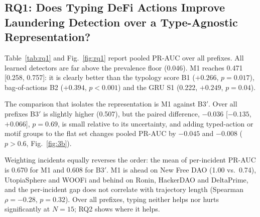 \documentclass[runningheads]{llncs}
\newcommand{\1}{\mathbb{1}}
\begin{document}
\subsection{RQ1: Does Typing DeFi Actions Improve Laundering Detection over a Type-Agnostic Representation?}
\label{sec:rq1}

Table~\ref{tab:rq1} and Fig.~\ref{fig:rq1} report pooled PR-AUC over all prefixes.
All learned detectors are far above the prevalence floor (0.046).
M1 reaches 0.471 [0.258, 0.757]: it is clearly better than the typology score B1 ($+0.266$, $p=0.017$), bag-of-actions B2 ($+0.394$, $p<0.001$) and the GRU S1 (0.222, $+0.249$, $p=0.04$).

The comparison that isolates the representation is M1 against B3$'$.
Over all prefixes B3$'$ is slightly higher (0.507), but the paired difference, $-0.036$ [$-0.135$, $+0.066]$, $p=0.69$, is small relative to its uncertainty, and adding typed-action or motif groups to the flat set changes pooled PR-AUC by $-0.045$ and $-0.008$ ($p>0.6$, Fig.~\ref{fig:3b}).

Weighting incidents equally reverses the order: the mean of per-incident PR-AUC is 0.670 for M1 and 0.608 for B3$'$.
M1 is ahead on New Free DAO (1.00 vs.\ 0.74), UtopiaSphere and WOOFi and behind on Ronin, HackerDAO and DeltaPrime, and the per-incident gap does not correlate with trajectory length (Spearman $\rho=-0.28$, $p=0.32$).
Over all prefixes, typing neither helps nor hurts significantly at $N=15$; RQ2 shows where it helps.
\end{document}
